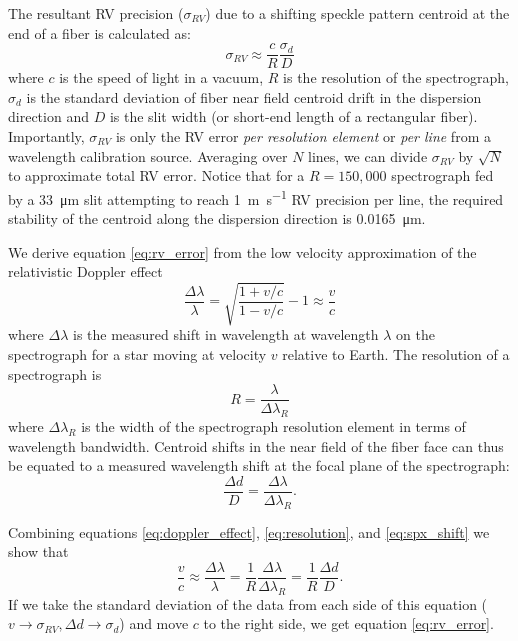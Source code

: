 \documentclass[twocolumn]{emulateapj}
\begin{document}
The resultant RV precision ($\sigma_{RV}$) due to a shifting speckle pattern centroid at the end of a fiber is calculated as:
\begin{equation}
\sigma_{RV} \approx \frac{c}{R} \frac{\sigma_d}{D}
\label{eq:rv_error}
\end{equation}
where $c$ is the speed of light in a vacuum, $R$ is the resolution of the spectrograph, $\sigma_d$ is the standard deviation of fiber near field centroid drift in the dispersion direction and $D$ is the slit width (or short-end length of a rectangular fiber). Importantly, $\sigma_{RV}$ is only the RV error \textit{per resolution element} or \textit{per line} from a wavelength calibration source. Averaging over $N$ lines, we can divide $\sigma_{RV}$ by $\sqrt{N}$ to approximate total RV error. Notice that for a $R=150,000$ spectrograph fed by a \SI{33}{\micro\meter} slit attempting to reach \SI{1}{\meter\per\second} RV precision per line, the required stability of the centroid along the dispersion direction is \SI{0.0165}{\micro\meter}.

We derive equation \ref{eq:rv_error} from the low velocity approximation of the relativistic Doppler effect
\begin{equation}
\frac{\Delta \lambda}{\lambda} = \sqrt{\frac{1 + v/c}{1-v/c}} - 1 \approx \frac{v}{c}
\label{eq:doppler_effect}
\end{equation}
where $\Delta \lambda$ is the measured shift in wavelength at wavelength $\lambda$ on the spectrograph for a star moving at velocity $v$ relative to Earth. The resolution of a spectrograph is
\begin{equation}
R = \frac{\lambda}{\Delta \lambda_R}
\label{eq:resolution}
\end{equation}
where $\Delta \lambda_R$ is the width of the spectrograph resolution element in terms of wavelength bandwidth. Centroid shifts in the near field of the fiber face can thus be equated to a measured wavelength shift at the focal plane of the spectrograph:
\begin{equation}
\frac{\Delta d}{D} = \frac{\Delta \lambda}{\Delta \lambda_R}.
\label{eq:spx_shift}
\end{equation}

Combining equations \ref{eq:doppler_effect}, \ref{eq:resolution}, and \ref{eq:spx_shift} we show that
\begin{equation}
\frac{v}{c} \approx \frac{\Delta \lambda}{\lambda} = \frac{1}{R} \frac{\Delta \lambda}{\Delta \lambda_R} = \frac{1}{R} \frac{\Delta d}{D}.
\end{equation}
If we take the standard deviation of the data from each side of this equation ($v \rightarrow \sigma_{RV}, \Delta d \rightarrow \sigma_d$) and move $c$ to the right side, we get equation \ref{eq:rv_error}.
\end{document}
